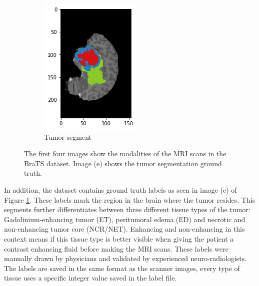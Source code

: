 \begin{figure}[H]
\begin{subfigure}[t]{.2\textwidth}
        \includegraphics[width=\linewidth]{chapters/04_segmentation/images/brats/4.png}
        \caption{Tumor segment}
    \end{subfigure}
    \caption{The first four images show the modalities of the MRI scans in the BraTS dataset. Image (e) shows the tumor segmentation ground truth.}
    \label{brats_example}
\end{figure}

In addition, the dataset contains ground truth labels as seen in image (e) of Figure \ref{brats_example}. These labels mark the region in the brain where the tumor resides. This segments further differentiates between three different tissue types of the tumor: Gadolinium-enhancing tumor (ET), peritumoral edema (ED) and necrotic and non-enhancing tumor core (NCR/NET). Enhancing and non-enhancing in this context means if this tissue type is better visible when giving the patient a contrast enhancing fluid before making the MRI scans. These labels were manually drawn by physicians and validated by experienced neuro-radiologists.
The labels are saved in the same format as the scanner images, every type of tissue uses a specific integer value saved in the label file.
